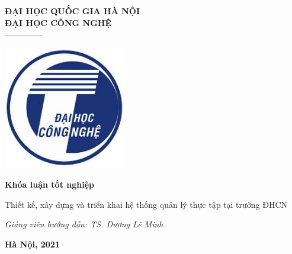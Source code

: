 \documentclass[./main.tex]{subfiles}
\begin{document}
\begin{titlepage}	
	\begin{center}
		\textbf{ĐẠI HỌC QUỐC GIA HÀ NỘI}\\
		\textbf{ĐẠI HỌC CÔNG NGHỆ}\\
		--------------
	
		\vspace*{30pt}
		
		\includegraphics[width=0.4\textwidth]{./images/uet.jpg}
		
		\vspace*{50pt}
		
		\textbf{Khóa luận tốt nghiệp}
		
		{\huge Thiết kế, xây dựng và triển khai hệ thống quản lý thực tập tại trường ĐHCN}
		\vspace*{30pt}

		\textit{Giảng viên hướng dẫn: TS. Dương Lê Minh}
		
		\vfill
	\end{center}
	
	
	\begin{center}
		\textbf{Hà Nội, 2021}
	\end{center}
\end{titlepage}
\end{document}
